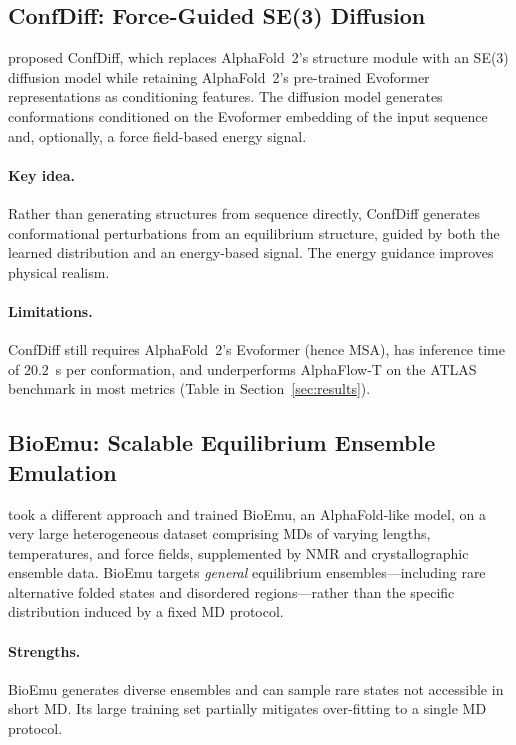 \documentclass[12pt,a4paper]{article}
\begin{document}
\subsection{ConfDiff: Force-Guided SE(3) Diffusion}
\label{sec:confdiff}

\citet{wang2024confdiff} proposed ConfDiff, which replaces AlphaFold~2's structure module with
an SE(3) diffusion model while retaining AlphaFold~2's pre-trained Evoformer representations
as conditioning features.  The diffusion model generates conformations conditioned on the
Evoformer embedding of the input sequence and, optionally, a force field-based energy signal.

\paragraph{Key idea.}
Rather than generating structures from sequence directly, ConfDiff generates conformational
perturbations from an equilibrium structure, guided by both the learned distribution and an
energy-based signal.  The energy guidance improves physical realism.

\paragraph{Limitations.}
ConfDiff still requires AlphaFold~2's Evoformer (hence MSA), has inference time of $20.2$~s
per conformation, and underperforms AlphaFlow-T on the ATLAS benchmark in most metrics
(Table in Section~\ref{sec:results}).

\subsection{BioEmu: Scalable Equilibrium Ensemble Emulation}
\label{sec:bioemu}

\citet{lewis2025bioemu} took a different approach and trained BioEmu, an AlphaFold-like model,
on a very large heterogeneous dataset comprising MDs of varying lengths, temperatures, and
force fields, supplemented by NMR and crystallographic ensemble data.  BioEmu targets
\emph{general} equilibrium ensembles---including rare alternative folded states and
disordered regions---rather than the specific distribution induced by a fixed MD protocol.

\paragraph{Strengths.}
BioEmu generates diverse ensembles and can sample rare states not accessible in short MD.
Its large training set partially mitigates over-fitting to a single MD protocol.
\end{document}
